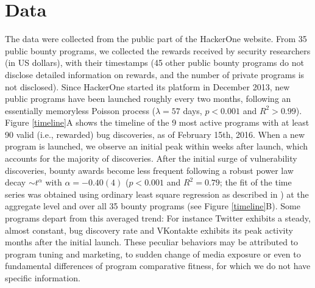 \section{Data}
\label{sec:data}
The data were collected from the public part of the HackerOne website. From 35 public bounty programs, we collected the rewards received by security researchers (in US dollars), with their timestamps (45 other public bounty programs do not disclose detailed information on rewards, and the number of private programs is not disclosed). Since HackerOne started its platform in December 2013, new public programs have been launched roughly every two months, following an essentially memoryless Poisson process ($\lambda = 57$ days, $p < 0.001$ and $R^2 > 0.99$). Figure \ref{timeline}A shows the timeline of the 9 most active programs with at least 90 valid (i.e., rewarded) bug discoveries, as of February 15th, 2016. When a new program is launched, we observe an initial peak within weeks after launch, which accounts for the majority of discoveries. After the initial surge of vulnerability discoveries, bounty awards become less frequent following a robust power law decay $\sim t^{\alpha}$ with $\alpha = -0.40(4)$ ($p < 0.001$ and $R^2 = 0.79$; the fit of the time series was obtained using ordinary least square regression as described in \cite{maillart2011quantification}) at the aggregate level and over all 35 bounty programs (see Figure \ref{timeline}B). Some programs depart from this averaged trend: For instance Twitter exhibits a steady, almost constant, bug discovery rate and VKontakte exhibits its peak activity months after the initial launch. These peculiar behaviors may be attributed to program tuning and marketing, to sudden change of media exposure or even to fundamental differences of program comparative fitness, for which we do not have specific information.\\

